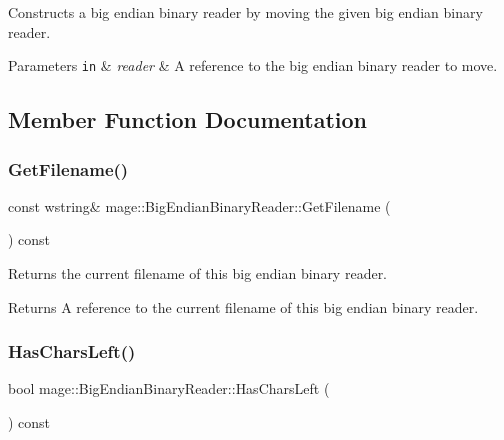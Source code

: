 Constructs a big endian binary reader by moving the given big endian binary reader.


\begin{DoxyParams}[1]{Parameters}
\mbox{\tt in}  & {\em reader} & A reference to the big endian binary reader to move. \\
\hline
\end{DoxyParams}


\subsection{Member Function Documentation}
\hypertarget{classmage_1_1_big_endian_binary_reader_a52b2695d83679943be40dc1328f9387f}{}\label{classmage_1_1_big_endian_binary_reader_a52b2695d83679943be40dc1328f9387f} 
\subsubsection{\texorpdfstring{Get\+Filename()}{GetFilename()}}
{\footnotesize\ttfamily const wstring\& mage\+::\+Big\+Endian\+Binary\+Reader\+::\+Get\+Filename (\begin{DoxyParamCaption}{ }\end{DoxyParamCaption}) const}

Returns the current filename of this big endian binary reader.

\begin{DoxyReturn}{Returns}
A reference to the current filename of this big endian binary reader. 
\end{DoxyReturn}
\hypertarget{classmage_1_1_big_endian_binary_reader_a312a8ec7497a8056695b0345115039bd}{}\label{classmage_1_1_big_endian_binary_reader_a312a8ec7497a8056695b0345115039bd} 
\subsubsection{\texorpdfstring{Has\+Chars\+Left()}{HasCharsLeft()}}
{\footnotesize\ttfamily bool mage\+::\+Big\+Endian\+Binary\+Reader\+::\+Has\+Chars\+Left (\begin{DoxyParamCaption}{ }\end{DoxyParamCaption}) const\hspace{0.3cm}{\ttfamily [protected]}}

